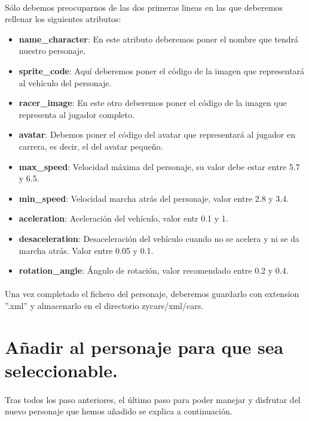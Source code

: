 \paragraph{}
Sólo debemos preocuparnos de las dos primeras lineas en las que deberemos rellenar los siguientes atributos:

\begin{itemize}
    \item \textbf{name\_character}: En este atributo deberemos poner el nombre que tendrá nuestro personaje.
    \item \textbf{sprite\_code}: Aquí deberemos poner el código de la imagen que representará al vehículo del personaje.
    \item \textbf{racer\_image}: En este otro deberemos poner el código de la imagen que representa al jugador completo.
    \item \textbf{avatar}: Debemos poner el código del avatar que representará al jugador en carrera, es decir, 
    el del avatar pequeño.
    \item \textbf{max\_speed}: Velocidad máxima del personaje, su valor debe estar entre 5.7 y 6.5.
    \item \textbf{min\_speed}: Velocidad marcha atrás del personaje, valor entre 2.8 y 3.4.
    \item \textbf{aceleration}: Aceleración del vehículo, valor entr 0.1 y 1.
    \item \textbf{desaceleration}: Desaceleración del vehículo cuando no se acelera y ni se da marcha atrás. Valor 
    entre 0.05 y 0.1.
    \item \textbf{rotation\_angle}: Ángulo de rotación, valor recomendado entre 0.2 y 0.4.
\end{itemize}

\paragraph{}
Una vez completado el fichero del personaje, deberemos guardarlo con extension ''.xml'' y almacenarlo en el directorio
zycars/xml/cars.

\section{Añadir al personaje para que sea seleccionable.}

\paragraph{}
Tras todos los paso anteriores, el último paso para poder manejar y disfrutar del nuevo personaje que hemos añadido se
explica a continuación.


